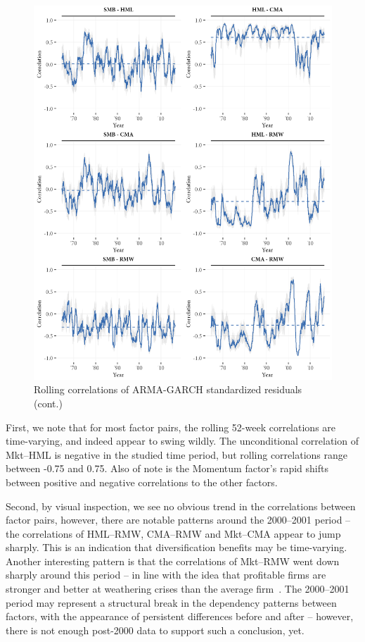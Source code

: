 \begin{figure}[!ht]
  \ContinuedFloat
  \centering
  \includegraphics[scale=1]{graphics/rolling2.png}  
  \footnotesize
  \caption{Rolling correlations of ARMA-GARCH standardized residuals (cont.)}
\end{figure}
First, we note that for most factor pairs, the rolling 52-week correlations are time-varying, and indeed appear to swing wildly. The unconditional correlation of Mkt--HML is negative in the studied time period, but rolling correlations range between -0.75 and 0.75. Also of note is the Momentum factor's rapid shifts between positive and negative correlations to the other factors. 

Second, by visual inspection, we see no obvious trend in the correlations between factor pairs, however, there are notable patterns around the 2000--2001 period -- the correlations of HML--RMW, CMA--RMW and Mkt--CMA appear to jump sharply. This is an indication that diversification benefits may be time-varying. Another interesting pattern is that the correlations of Mkt--RMW went down sharply around this period -- in line with the idea that profitable firms are stronger and better at weathering crises than the average firm~\autocite{NovyMarx2013}. The 2000--2001 period may represent a structural break in the dependency patterns between factors, with the appearance of persistent differences before and after -- however, there is not enough post-2000 data to support such a conclusion, yet.

